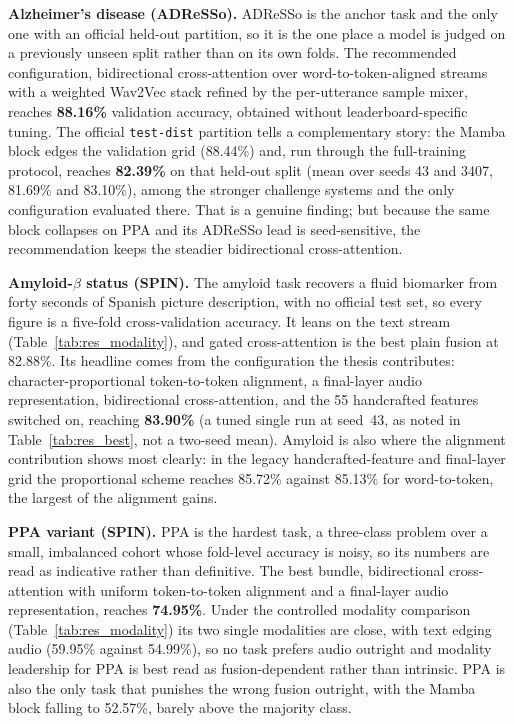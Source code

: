\textbf{Alzheimer's disease (ADReSSo).} ADReSSo is the anchor task and the only one with an official held-out partition, so it is the one place a model is judged on a previously unseen split rather than on its own folds. The recommended configuration, bidirectional cross-attention over word-to-token-aligned streams with a weighted Wav2Vec stack refined by the per-utterance sample mixer, reaches \textbf{88.16\%} validation accuracy, obtained without leaderboard-specific tuning. The official \texttt{test-dist} partition tells a complementary story: the Mamba block edges the validation grid (88.44\%) and, run through the full-training protocol, reaches \textbf{82.39\%} on that held-out split (mean over seeds 43 and 3407, 81.69\% and 83.10\%), among the stronger challenge systems and the only configuration evaluated there. That is a genuine finding; but because the same block collapses on PPA and its ADReSSo lead is seed-sensitive, the recommendation keeps the steadier bidirectional cross-attention.

\textbf{Amyloid-$\beta$ status (SPIN).} The amyloid task recovers a fluid biomarker from forty seconds of Spanish picture description, with no official test set, so every figure is a five-fold cross-validation accuracy. It leans on the text stream (Table~\ref{tab:res_modality}), and gated cross-attention is the best plain fusion at 82.88\%. Its headline comes from the configuration the thesis contributes: character-proportional token-to-token alignment, a final-layer audio representation, bidirectional cross-attention, and the 55 handcrafted features switched on, reaching \textbf{83.90\%} (a tuned single run at seed~43, as noted in Table~\ref{tab:res_best}, not a two-seed mean). Amyloid is also where the alignment contribution shows most clearly: in the legacy handcrafted-feature and final-layer grid the proportional scheme reaches 85.72\% against 85.13\% for word-to-token, the largest of the alignment gains.

\textbf{PPA variant (SPIN).} PPA is the hardest task, a three-class problem over a small, imbalanced cohort whose fold-level accuracy is noisy, so its numbers are read as indicative rather than definitive. The best bundle, bidirectional cross-attention with uniform token-to-token alignment and a final-layer audio representation, reaches \textbf{74.95\%}. Under the controlled modality comparison (Table~\ref{tab:res_modality}) its two single modalities are close, with text edging audio (59.95\% against 54.99\%), so no task prefers audio outright and modality leadership for PPA is best read as fusion-dependent rather than intrinsic. PPA is also the only task that punishes the wrong fusion outright, with the Mamba block falling to 52.57\%, barely above the majority class.

